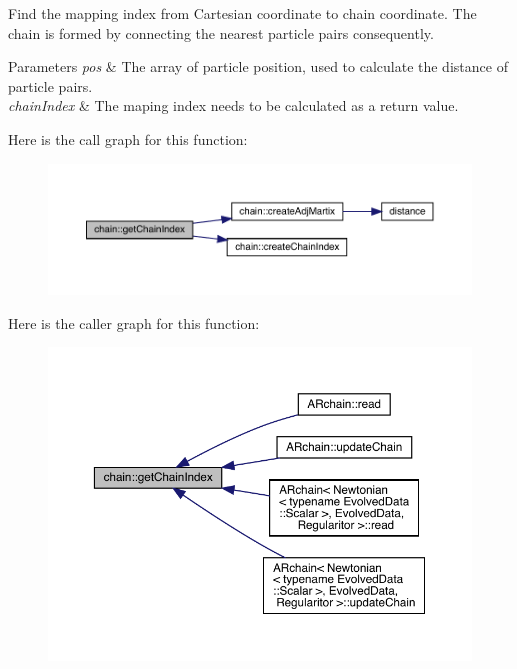 Find the mapping index from Cartesian coordinate to chain coordinate. The chain is formed by connecting the nearest particle pairs consequently. 
\begin{DoxyParams}{Parameters}
{\em pos} & The array of particle position, used to calculate the distance of particle pairs. \\
\hline
{\em chain\+Index} & The maping index needs to be calculated as a return value. \\
\hline
\end{DoxyParams}
Here is the call graph for this function\+:\nopagebreak
\begin{figure}[H]
\begin{center}
\leavevmode
\includegraphics[width=350pt]{namespacechain_a3e7b0a001442f121ce1408e7c9d12016_cgraph}
\end{center}
\end{figure}
Here is the caller graph for this function\+:\nopagebreak
\begin{figure}[H]
\begin{center}
\leavevmode
\includegraphics[width=350pt]{namespacechain_a3e7b0a001442f121ce1408e7c9d12016_icgraph}
\end{center}
\end{figure}
\mbox{\label{namespacechain_a874f28a6248b56c6b2b3ca45c1bbea09}} 
